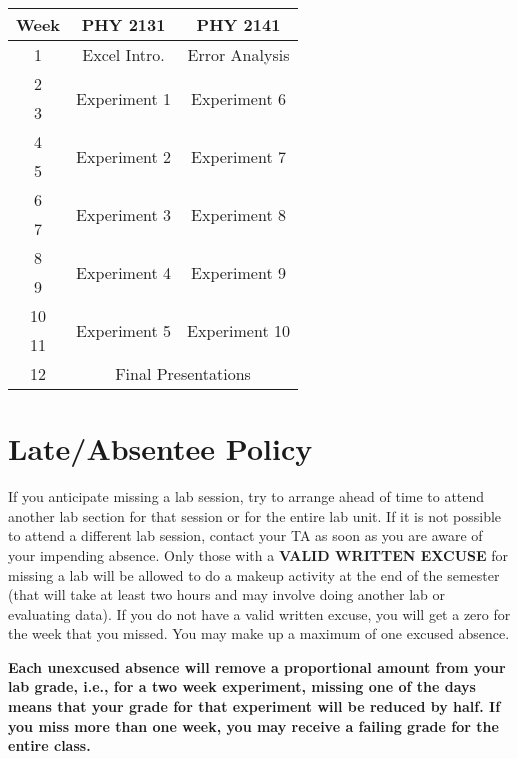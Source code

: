 \begin{table}[ht]
	\centering
	\begin{tabular}{ |c||c|c| } 
	 \hline
	 \textbf{Week} & \textbf{PHY 2131} & \textbf{PHY 2141} \\
	 \hline
	 1 & Excel Intro. & Error Analysis \\ 
	 \hline 
	 2 & \multirow{2}{*}{Experiment 1} & \multirow{2}{*}{Experiment 6} \\ 
	 \cline{1-1}
	 3 &  &  \\ 
	 \hline
	 4 & \multirow{2}{*}{Experiment 2} & \multirow{2}{*}{Experiment 7} \\ 
	 \cline{1-1}
	 5 &  &  \\ 
	 \hline
	 6 & \multirow{2}{*}{Experiment 3} & \multirow{2}{*}{Experiment 8} \\ 
	 \cline{1-1}
	 7 &  &  \\ 
	 \hline
	 8 & \multirow{2}{*}{Experiment 4} & \multirow{2}{*}{Experiment 9} \\ 
	 \cline{1-1}
	 9 &  &   \\ 
	 \hline
	 10 & \multirow{2}{*}{Experiment 5} & \multirow{2}{*}{Experiment 10} \\ 
	 \cline{1-1}
	 11 &  &   \\ 
	 \hline
	 12 & \multicolumn{2}{c|}{Final Presentations} \\ 
	 \hline
	\end{tabular}
\end{table}

\section*{Late/Absentee Policy}
If you anticipate missing a lab session, try to arrange ahead of time to attend another lab section for that session or for the entire lab unit.
If it is not possible to attend a different lab session, contact your TA as soon as you are aware of your impending absence.
Only those with a \textbf{VALID WRITTEN EXCUSE} for missing a lab will be allowed to do a makeup activity at the end of the semester (that will take at least two hours and may involve doing another lab or evaluating data).
If you do not have a valid written excuse, you will get a zero for the week that you missed.
You may make up a maximum of one excused absence.
\par
\textbf{Each unexcused absence will remove a proportional amount from your lab grade, i.e., for a two week experiment, missing one of the days means that your grade for that experiment will be reduced by half.
If you miss more than one week, you may receive a failing grade for the entire class.}

